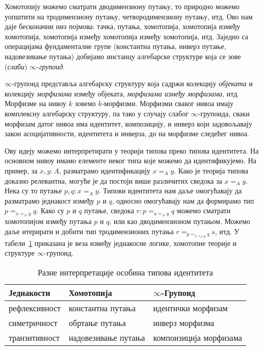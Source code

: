 \documentclass[12pt,oneside]{memoir}
\begin{document}
Хомотопију можемо сматрати дводимензиону путању, то природно можемо уопштити на тродимензиону путању, четвородимензиону путању, итд. Ово нам даје бесконачни низ појмова: тачка, путања, хомотопија, хомотопија између хомотопија, хомотопија између хомотопија између хомотопија, итд. Заједно са операцијама фундаменталне групе (константна путања, инверз путање, надовезивање путања) добијамо инстанцу алгебарске структуре која се зове (\emph{слаби}) $\infty$-\emph{групоид}.

$\infty$-групоид представља алгебарску структуру која садржи колекцију \emph{објеката} и колекцију \emph{морфизама} између објеката, \emph{морфизама између морфизама}, итд. Морфизме на нивоу $k$ зовемо $k$-морфизми. Морфизми сваког нивоа имају комплексну алгебарску структуру, па тако у случају слабог $\infty$-групоида, сваки морфизам датог нивоа има идентитет, композицију, и инверз који задовољавају закон асоцијативности, идентитета и инверза, до на морфизме следећег нивоа.

Ову идеју можемо интерпретирати у теорији типова преко типова идентитета. На основном нивоу имамо елементе неког типа које можемо да идентификујемо. На пример, за $x, y : A$, разматрамо идентификацију $x =_A y$. Како је теорија типова доказно релевантна, могуће је да постоји више различитих сведока за $x =_A y$. Нека су то путање $p, q : x =_A y$. Типови идентитета нам даље омогућавају да разматрамо једнакост између $p$ и $q$, односно омогућавају нам да формирамо тип $p =_{x =_A y} q$. Како су $p$ и $q$ путање, сведока $r : p =_{x =_A y} q$ можемо сматрати хомотопијом између путања $p$ и $q$, или као дводимензионом путањом. Можемо даље итерирати и добити тип тродимензионих путања $r =_{p =_{x =_A y} q} s$, итд. У табели~\ref{table:inftygroupoid} приказана је веза између једнакосне логике, хомотопне теорије и структуре $\infty$-групоид.

\begin{table}
    \begin{center}
        \begin{tabular}[c]{l l l}
            Једнакости & Хомотопија & $\infty$-Групоид \\
            \hline%
            рефлексивност & константна путања & идентички морфизам \\
            симетричност & обртање путања & инверз морфизма \\
            транзитивност & надовезивање путања & компоизиција морфизама\\
        \end{tabular}
    \end{center}
    \caption{Разне интерпретације особина типова идентитета}
    \label{table:inftygroupoid}
\end{table}
\end{document}
